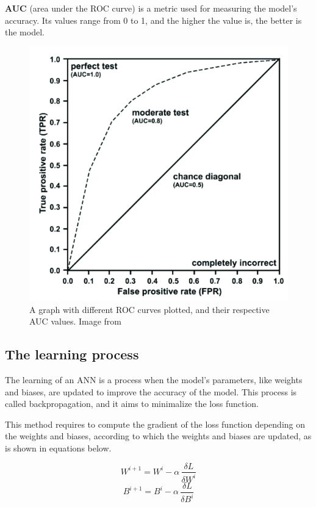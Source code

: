 \documentclass[thesis=B,english]{FITthesis}[2019/12/23]
\begin{document}
\textbf{AUC} (area under the ROC curve) is a metric used for measuring the model's accuracy. Its values range from 0 to 1, and the higher the value is, the better is the model.

\begin{figure}[h]
		\includegraphics[scale=0.45]{images/roc_auc.png}
		\centering
		\caption{A graph with different ROC curves plotted, and their respective AUC values. Image from \cite{juliani_ellefmo_2019}}
		\label{roc}
\end{figure}

\subsection{The learning process}

The learning of an ANN is a process when the model's parameters, like weights and biases, are updated to improve the accuracy of the model. This process is called backpropagation, and it aims to minimalize the loss function.

This method requires to compute the gradient of the loss function depending on the weights and biases, according to which the weights and biases are updated, as is shown in equations below.

\begin{equation}
   W^{i+1} = W^{i} - \alpha \, \dfrac{\delta L}{\delta W^{i}} 
\end{equation}
\begin{equation}
    B^{i+1} = B^{i} - \alpha \, \dfrac{\delta L}{\delta B^{i}}
\end{equation}
\end{document}
